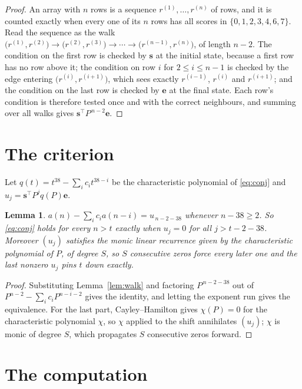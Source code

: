 \documentclass[11pt,a4paper]{article}
\theoremstyle{plain}
\newtheorem{lemma}[theorem]{Lemma}
\theoremstyle{definition}
\begin{document}
\begin{proof}
An array with $n$ rows is a sequence $r^{(1)},\dots,r^{(n)}$ of rows, and it is counted
exactly when every one of its $n$ rows has all scores in $\{0,1,2,3,4,6,7\}$. Read the sequence as the
walk $\bigl(r^{(1)},r^{(2)}\bigr)\to\bigl(r^{(2)},r^{(3)}\bigr)\to\cdots\to
\bigl(r^{(n-1)},r^{(n)}\bigr)$, of length $n-2$. The condition on the first row is
checked by $\mathbf{s}$ at the initial state, because a first row has no row above it; the
condition on row $i$ for $2\le i\le n-1$ is checked by the edge entering
$\bigl(r^{(i)},r^{(i+1)}\bigr)$, which sees exactly $r^{(i-1)}$, $r^{(i)}$ and
$r^{(i+1)}$; and the condition on the last row is checked by $\mathbf{e}$ at the final
state. Each row's condition is therefore tested once and with the correct neighbours, and
summing over all walks gives $\mathbf{s}^{\!\top}P^{\,n-2}\mathbf{e}$.
\end{proof}

\section{The criterion}

Let $q(t)=t^{38}-\sum_i c_i t^{38-i}$ be the characteristic polynomial of
\eqref{eq:conj} and $u_j=\mathbf{s}^{\!\top}P^{j}q(P)\mathbf{e}$.

\begin{lemma}\label{lem:crit}
$a(n)-\sum_i c_i a(n-i)=u_{\,n-2-38}$ whenever $n-38\ge2$. So \eqref{eq:conj}
holds for every $n>t$ exactly when $u_j=0$ for all $j>t-2-38$. Moreover $(u_j)$
satisfies the monic linear recurrence given by the characteristic polynomial of $P$, of
degree $S$, so $S$ consecutive zeros force every later one and the last nonzero $u_j$ pins
$t$ down exactly.
\end{lemma}

\begin{proof}
Substituting Lemma~\ref{lem:walk} and factoring $P^{\,n-2-38}$ out of
$P^{n-2}-\sum_i c_i P^{n-i-2}$ gives the identity, and letting the exponent run gives the
equivalence. For the last part, Cayley--Hamilton gives $\chi(P)=0$ for the characteristic
polynomial $\chi$, so $\chi$ applied to the shift annihilates $(u_j)$; $\chi$ is monic of
degree $S$, which propagates $S$ consecutive zeros forward.
\end{proof}

\section{The computation}
\end{document}
